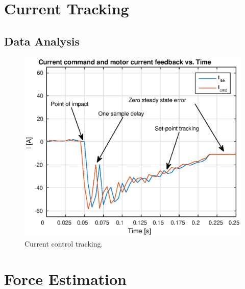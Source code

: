 \section{Current Tracking}

\subsection{Data Analysis}

\begin{figure}
\centering
\includegraphics[width=1\textwidth]{images/experiments/current-tracking-impact.eps} 
\caption{Current control tracking.}
\label{fig:Current control tracking}
\end{figure}

\section{Force Estimation}
